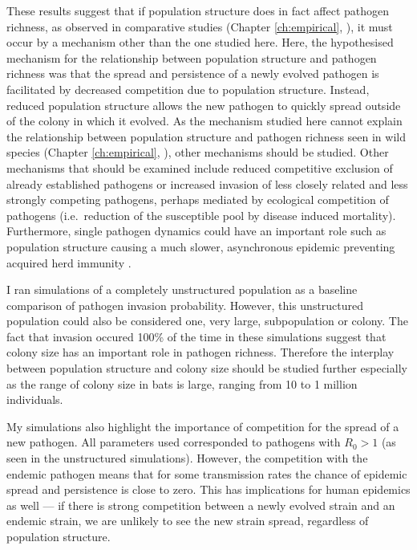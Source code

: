 These results suggest that if population structure does in fact affect pathogen richness, as observed in comparative studies (Chapter \ref{ch:empirical}, \cites{vitone2004body, maganga2014bat, turmelle2009correlates}), it must occur by a mechanism other than the one studied here.
Here, the hypothesised mechanism for the relationship between population structure and pathogen richness was that the spread and persistence of a newly evolved pathogen is facilitated by decreased competition due to population structure.
Instead, reduced population structure allows the new pathogen to quickly spread outside of the colony in which it evolved.
As the mechanism studied here cannot explain the relationship between population structure and pathogen richness seen in wild species (Chapter \ref{ch:empirical}, \cites{vitone2004body, maganga2014bat, turmelle2009correlates}), other mechanisms should be studied.
Other mechanisms that should be examined include reduced competitive exclusion of already established pathogens or increased invasion of less closely related and less strongly competing pathogens, perhaps mediated by ecological competition of pathogens (i.e.\ reduction of the susceptible pool by disease induced mortality).
Furthermore, single pathogen dynamics could have an important role such as population structure causing a much slower, asynchronous epidemic preventing acquired herd immunity \cite{plowright2011urban}.

I ran simulations of a completely unstructured population as a baseline comparison of pathogen invasion probability.
However, this unstructured population could also be considered one, very large, subpopulation or colony.
The fact that invasion occured 100\% of the time in these simulations suggest that colony size has an important role in pathogen richness.
Therefore the interplay between population structure and colony size should be studied further especially as the range of colony size in bats is large, ranging from 10 to 1 million \cite{jones2009pantheria} individuals.

My simulations also highlight the importance of competition for the spread of a new pathogen.
All parameters used corresponded to pathogens with $R_0>1$ (as seen in the unstructured simulations).
However, the competition with the endemic pathogen means that for some transmission rates the chance of epidemic spread and persistence is close to zero.
This has implications for human epidemics as well --- if there is strong competition between a newly evolved strain and an endemic strain, we are unlikely to see the new strain spread, regardless of population structure.



